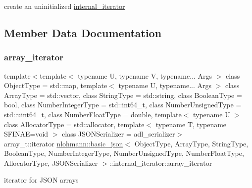 create an uninitialized \hyperlink{structnlohmann_1_1basic__json_1_1internal__iterator}{internal\+\_\+iterator} 



\subsection{Member Data Documentation}
\mbox{\label{structnlohmann_1_1basic__json_1_1internal__iterator_ac2ffb13621ff7e261362624c4b790049}} 
\subsubsection{\texorpdfstring{array\+\_\+iterator}{array\_iterator}}
{\footnotesize\ttfamily template$<$template$<$ typename U, typename V, typename... Args $>$ class Object\+Type = std\+::map, template$<$ typename U, typename... Args $>$ class Array\+Type = std\+::vector, class String\+Type  = std\+::string, class Boolean\+Type  = bool, class Number\+Integer\+Type  = std\+::int64\+\_\+t, class Number\+Unsigned\+Type  = std\+::uint64\+\_\+t, class Number\+Float\+Type  = double, template$<$ typename U $>$ class Allocator\+Type = std\+::allocator, template$<$ typename T, typename S\+F\+I\+N\+A\+E=void $>$ class J\+S\+O\+N\+Serializer = adl\+\_\+serializer$>$ \\
array\+\_\+t\+::iterator \hyperlink{classnlohmann_1_1basic__json}{nlohmann\+::basic\+\_\+json}$<$ Object\+Type, Array\+Type, String\+Type, Boolean\+Type, Number\+Integer\+Type, Number\+Unsigned\+Type, Number\+Float\+Type, Allocator\+Type, J\+S\+O\+N\+Serializer $>$\+::internal\+\_\+iterator\+::array\+\_\+iterator}



iterator for J\+S\+ON arrays 

\mbox{\label{structnlohmann_1_1basic__json_1_1internal__iterator_a737aaeccb3a9de3301b5e363c7cbd52f}} 
